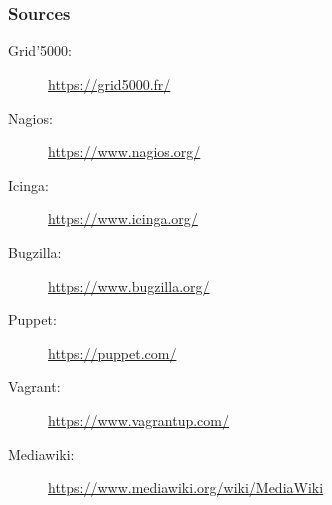 \documentclass[11pt,compress]{beamer}
\begin{document}
\section*{}
\begin{frame}
\frametitle{Sources}
\begin{description}
\item[Grid'5000:]\url{https://grid5000.fr/}
\item[Nagios:]\url{https://www.nagios.org/}
\item[Icinga:]\url{https://www.icinga.org/}
\item[Bugzilla:]\url{https://www.bugzilla.org/}
\item[Puppet:]\url{https://puppet.com/}
\item[Vagrant:]\url{https://www.vagrantup.com/}
\item[Mediawiki:]\url{https://www.mediawiki.org/wiki/MediaWiki}
\end{description}
\end{frame}
\end{document}
